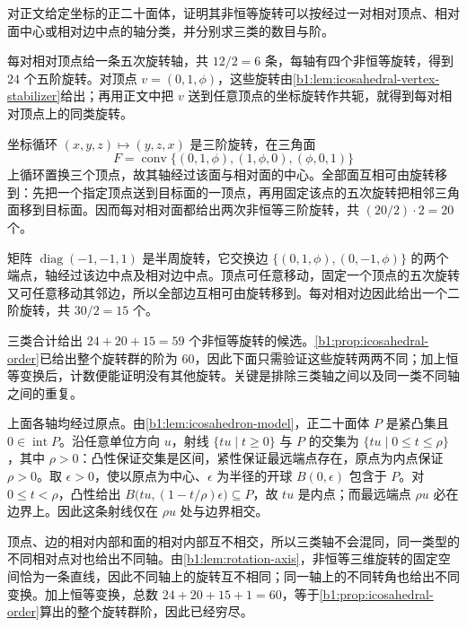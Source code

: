 \begin{exercise}\label{b1:ex:03-icosahedral-rotations}
	对正文给定坐标的正二十面体，证明其非恒等旋转可以按经过一对相对顶点、相对面中心或相对边中点的轴分类，并分别求三类的数目与阶。
\end{exercise}
\begin{solution}
	每对相对顶点给一条五次旋转轴，共 \(12/2=6\) 条，每轴有四个非恒等旋转，得到 \(24\) 个五阶旋转。对顶点 \(v=(0,1,\phi)\)，这些旋转由\cref{b1:lem:icosahedral-vertex-stabilizer}给出；再用正文中把 \(v\) 送到任意顶点的坐标旋转作共轭，就得到每对相对顶点上的同类旋转。

	坐标循环 \((x,y,z)\mapsto(y,z,x)\) 是三阶旋转，在三角面
	\[
		F=\operatorname{conv}\bigl\{(0,1,\phi),(1,\phi,0),(\phi,0,1)\bigr\}
	\]
	上循环置换三个顶点，故其轴经过该面与相对面的中心。全部面互相可由旋转移到：先把一个指定顶点送到目标面的一顶点，再用固定该点的五次旋转把相邻三角面移到目标面。因而每对相对面都给出两次非恒等三阶旋转，共 \((20/2)\cdot2=20\) 个。

	矩阵 \(\operatorname{diag}(-1,-1,1)\) 是半周旋转，它交换边 \(\bigl\{(0,1,\phi),(0,-1,\phi)\bigr\}\) 的两个端点，轴经过该边中点及相对边中点。顶点可任意移动，固定一个顶点的五次旋转又可任意移动其邻边，所以全部边互相可由旋转移到。每对相对边因此给出一个二阶旋转，共 \(30/2=15\) 个。

	三类合计给出 \(24+20+15=59\) 个非恒等旋转的候选。\cref{b1:prop:icosahedral-order}已给出整个旋转群的阶为 \(60\)，因此下面只需验证这些旋转两两不同；加上恒等变换后，计数便能证明没有其他旋转。关键是排除三类轴之间以及同一类不同轴之间的重复。

	上面各轴均经过原点。由\cref{b1:lem:icosahedron-model}，正二十面体 \(P\) 是紧凸集且 \(0\in\operatorname{int}P\)。沿任意单位方向 \(u\)，射线 \(\{tu\mid t\geq0\}\) 与 \(P\) 的交集为 \(\{tu\mid0\leq t\leq\rho\}\)，其中 \(\rho>0\)：凸性保证交集是区间，紧性保证最远端点存在，原点为内点保证 \(\rho>0\)。取 \(\epsilon>0\)，使以原点为中心、\(\epsilon\) 为半径的开球 \(B(0,\epsilon)\) 包含于 \(P\)。对 \(0\leq t<\rho\)，凸性给出 \(B\bigl(tu,(1-t/\rho)\epsilon\bigr)\subseteq P\)，故 \(tu\) 是内点；而最远端点 \(\rho u\) 必在边界上。因此这条射线仅在 \(\rho u\) 处与边界相交。

	顶点、边的相对内部和面的相对内部互不相交，所以三类轴不会混同，同一类型的不同相对点对也给出不同轴。由\cref{b1:lem:rotation-axis}，非恒等三维旋转的固定空间恰为一条直线，因此不同轴上的旋转互不相同；同一轴上的不同转角也给出不同变换。加上恒等变换，总数 \(24+20+15+1=60\)，等于\cref{b1:prop:icosahedral-order}算出的整个旋转群阶，因此已经穷尽。
\end{solution}
